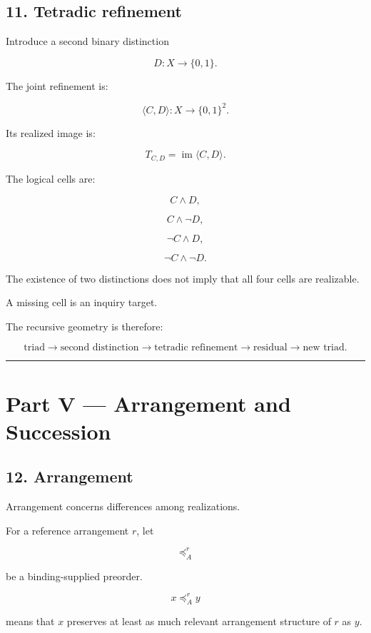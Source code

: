 \documentclass[
]{article}
\begin{document}
\subsection{11. Tetradic refinement}\label{tetradic-refinement}

Introduce a second binary distinction

\[
D:X\to\{0,1\}.
\]

The joint refinement is:

\[
\boxed{
\langle C,D\rangle
:
X\to\{0,1\}^2.
}
\]

Its realized image is:

\[
\boxed{
T_{C,D}
=
\operatorname{im}\langle C,D\rangle.
}
\]

The logical cells are:

\[
C\land D,
\]

\[
C\land\neg D,
\]

\[
\neg C\land D,
\]

\[
\neg C\land\neg D.
\]

The existence of two distinctions does not imply that all four cells are
realizable.

A missing cell is an inquiry target.

The recursive geometry is therefore:

\[
\boxed{
\text{triad}
\to
\text{second distinction}
\to
\text{tetradic refinement}
\to
\text{residual}
\to
\text{new triad}.
}
\]

\begin{center}\rule{0.5\linewidth}{0.5pt}\end{center}

\section{Part V --- Arrangement and
Succession}\label{part-v-arrangement-and-succession}

\subsection{12. Arrangement}\label{arrangement}

Arrangement concerns differences among realizations.

For a reference arrangement \(r\), let

\[
\preceq_A^r
\]

be a binding-supplied preorder.

\[
x\preceq_A^r y
\]

means that \(x\) preserves at least as much relevant arrangement
structure of \(r\) as \(y\).
\end{document}
